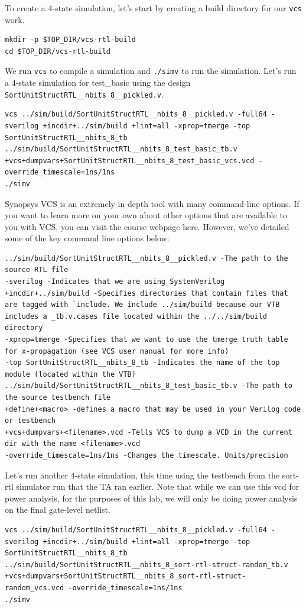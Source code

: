\documentclass[a4paper,12pt,twoside]{article}
\begin{document}
To create a 4-state simulation, let’s start by creating a build directory for our \texttt{vcs} work.
\begin{verbatim}
mkdir -p $TOP_DIR/vcs-rtl-build
cd $TOP_DIR/vcs-rtl-build
\end{verbatim}
We run \texttt{vcs} to compile a simulation and \texttt{./simv} to run the simulation. Let’s run a 4-state simulation for test\_basic using the design \texttt{SortUnitStructRTL\_\_nbits\_8\_\_pickled.v}.
\begin{verbatim}
vcs ../sim/build/SortUnitStructRTL__nbits_8__pickled.v -full64 -sverilog +incdir+../sim/build +lint=all -xprop=tmerge -top SortUnitStructRTL__nbits_8_tb ../sim/build/SortUnitStructRTL__nbits_8_test_basic_tb.v +vcs+dumpvars+SortUnitStructRTL__nbits_8_test_basic_vcs.vcd -override_timescale=1ns/1ns
./simv
\end{verbatim}
Synopsys VCS is an extremely in-depth tool with many command-line options. If you want to learn more on your own about other options that are available to you with VCS, you can visit the course webpage here. However, we’ve detailed some of the key command line options below:
\begin{verbatim}
../sim/build/SortUnitStructRTL__nbits_8__pickled.v -The path to the source RTL file
-sverilog -Indicates that we are using SystemVerilog
+incdir+../sim/build -Specifies directories that contain files that are tagged with `include. We include ../sim/build because our VTB includes a _tb.v.cases file located within the ../../sim/build directory
-xprop=tmerge -Specifies that we want to use the tmerge truth table for x-propagation (see VCS user manual for more info)
-top SortUnitStructRTL__nbits_8_tb -Indicates the name of the top module (located within the VTB)
../sim/build/SortUnitStructRTL__nbits_8_test_basic_tb.v -The path to the source testbench file
+define+<macro> -defines a macro that may be used in your Verilog code or testbench
+vcs+dumpvars+<filename>.vcd -Tells VCS to dump a VCD in the current dir with the name <filename>.vcd
-override_timescale=1ns/1ns -Changes the timescale. Units/precision
\end{verbatim}
Let’s run another 4-state simulation, this time using the testbench from the sort-rtl simulator run that the TA ran earlier. Note that while we can use this vcd for power analysis, for the purposes of this lab, we will only be doing power analysis on the final gate-level netlist.%
\begin{verbatim}
vcs ../sim/build/SortUnitStructRTL__nbits_8__pickled.v -full64 -sverilog +incdir+../sim/build +lint=all -xprop=tmerge -top SortUnitStructRTL__nbits_8_tb ../sim/build/SortUnitStructRTL__nbits_8_sort-rtl-struct-random_tb.v +vcs+dumpvars+SortUnitStructRTL__nbits_8_sort-rtl-struct-random_vcs.vcd -override_timescale=1ns/1ns
./simv
\end{verbatim}
\end{document}
